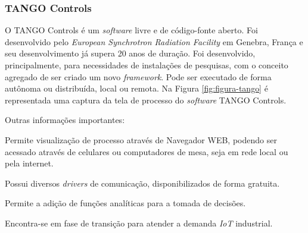 \subsubsection{TANGO Controls}
\label{sec:tango}

    O TANGO Controls \cite{Tango} é um \textit{software} livre e de código-fonte aberto. Foi desenvolvido pelo \textit{European Synchrotron Radiation Facility} em Genebra, França e seu desenvolvimento já supera 20 anos de duração. Foi desenvolvido, principalmente, para necessidades de instalações de pesquisas, com o conceito agregado de ser criado um novo \textit{framework}. Pode ser executado de forma autônoma ou distribuída, local ou remota. Na Figura \ref{fig:figura-tango} é representada uma captura da tela de processo do \textit{software} TANGO Controls.

    \begin{figure}[!h]
    \end{figure}
\newpage
    Outras informações importantes:
    
    \begin{alineascomponto}
	    \item Permite visualização de processo através de Navegador \gls{WEB}, podendo ser acessado através de celulares ou computadores de mesa, seja em rede local ou pela internet.
    	\item Possui diversos \textit{drivers} de comunicação, disponibilizados de forma gratuita.
    	\item Permite a adição de funções analíticas para a tomada de decisões.
    	\item Encontra-se em fase de transição para atender a demanda \textit{IoT} industrial.
    \end{alineascomponto}
    

